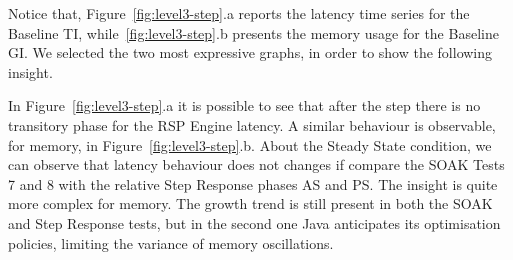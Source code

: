 Notice that, Figure~\ref{fig:level3-step}.a reports the latency time series for the Baseline TI, while~\ref{fig:level3-step}.b presents the memory usage for the Baseline GI. We selected the two most expressive graphs, in order to show the following insight.

%
%

In Figure~\ref{fig:level3-step}.a  it is possible to see that after the step there is no transitory phase for the RSP Engine latency. A similar behaviour is observable, for memory, in Figure~\ref{fig:level3-step}.b. About the Steady State condition, we can observe that latency behaviour does not changes if compare the SOAK Tests 7 and 8 with the relative  Step Response phases AS and PS. The insight is quite more complex for memory. The growth trend is still present in both the SOAK and Step Response tests, but in the second one Java anticipates its optimisation policies, limiting the variance of memory oscillations. 


